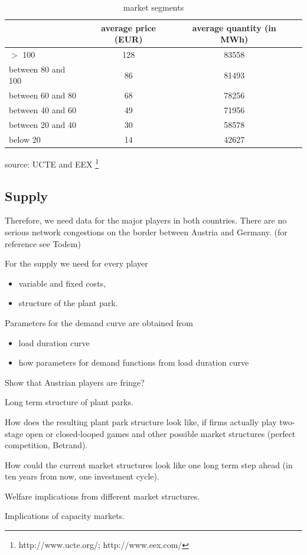 \begin{table}
\begin{tabular}{llll}
 & \multicolumn{1}{c}{average price (EUR)} & \multicolumn{1}{c}{average quantity (in MWh)} &  \\ 
 \hline
$>$ 100 & \multicolumn{1}{c}{128} & \multicolumn{1}{c}{83558} &  \\ 
between 80 and 100 & \multicolumn{1}{c}{86} & \multicolumn{1}{c}{81493} &  \\ 
between 60 and 80 & \multicolumn{1}{c}{68} & \multicolumn{1}{c}{78256} &  \\ 
between 40 and 60 & \multicolumn{1}{c}{49} & \multicolumn{1}{c}{71956} &  \\ 
between 20 and 40 & \multicolumn{1}{c}{30} & \multicolumn{1}{c}{58578} &  \\ 
below 20 & \multicolumn{1}{c}{14} & \multicolumn{1}{c}{42627} &  \\ 
\hline
\end{tabular}
\label{tab:demand}
\caption{market segments}
\begin{center}
source: UCTE and EEX \footnote{http://www.ucte.org/; http://www.eex.com/}
\end{center}    
\end{table}

\subsection{Supply}




Therefore, we need data for the major players in both countries. There are no serious network congestions on the border between Austria and Germany. (for reference see Todem)

For the supply we need for every player

\begin{itemize}
\item variable and fixed costs,
\item structure of the plant park.
\end{itemize}

Parameters for the demand curve are obtained from

\begin{itemize}
\item load duration curve
\item how parameters for demand functions from load duration curve
\end{itemize}

Show that Austrian players are fringe? 

Long term structure of plant parks.

How does the resulting plant park structure look like, if firms actually play two-stage open or closed-looped games and other possible market structures (perfect competition, Betrand). 

How could the current market structures look like one long term step ahead (in ten years from now, one investment cycle).

Welfare implications from different market structures.

Implications of capacity markets.


